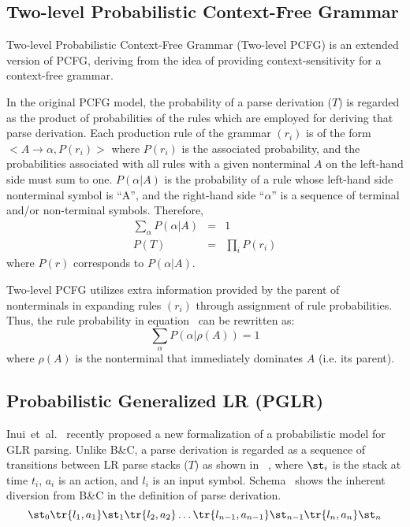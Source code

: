 \subsection{Two-level Probabilistic Context-Free Grammar}

Two-level Probabilistic Context-Free Grammar (Two-level PCFG) is an
extended version of PCFG, deriving from the idea of providing
context-sensitivity for a context-free grammar.

In the original PCFG model, the probability of a parse derivation ($T$)
is regarded as the product of probabilities of the rules which are
employed for deriving that parse derivation. Each production rule of the
grammar $(r_i)$ is of the form $<A \rightarrow \alpha, P(r_i)>$ where
$P(r_i)$ is the associated probability, and the probabilities associated
with all rules with a given nonterminal $A$ on the left-hand side must
sum to one. $P(\alpha | A)$ is the probability of a rule whose left-hand
side nonterminal symbol is ``A'', and the right-hand side ``$\alpha$''
is a sequence of terminal and/or non-terminal symbols. Therefore,
\begin{eqnarray}
  \label{eq:pcfg}
  \sum_{\alpha} P(\alpha | A) &=& 1\\
  P(T) &=& \prod_{i} P(r_i)
\end{eqnarray}
where $P(r)$ corresponds to $P(\alpha | A)$.

Two-level PCFG utilizes extra information provided by the parent of
nonterminals in expanding rules $(r_i)$ through assignment of rule
probabilities. Thus, the rule probability in equation~ can be
rewritten as:
\begin{equation}
  \label{eq:2-pcfg}
  \sum_{\alpha} P(\alpha | \rho(A)) = 1
\end{equation}
where $\rho(A)$ is the nonterminal that immediately dominates $A$
(i.e. its parent).

\subsection{Probabilistic Generalized LR (PGLR)}
Inui~et~al.~\cite{Inui:97a} recently proposed a new formalization of a
probabilistic model for GLR parsing. Unlike B\&C, a parse derivation
is regarded as a sequence of transitions between LR parse stacks ($T$)
as shown in ~, where $\st_i$ is the stack at time $t_i$,
$a_i$ is an action, and $l_i$ is an input symbol. Schema~
shows the inherent diversion from B\&C in the definition of parse
derivation.
\begin{equation}
  \label{eq:pglr-def}
  \st_0\tr{l_1,a_1}\st_1\tr{l_2,a_2}
  \ldots\tr{l_{n-1},a_{n-1}}\st_{n-1}\tr{l_n,a_n}\st_n
\end{equation}

